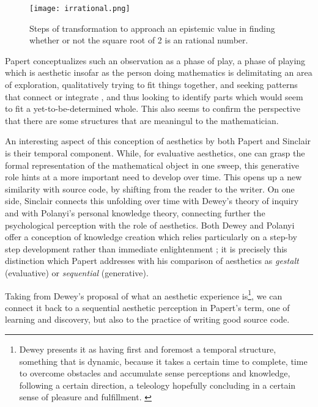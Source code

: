 \begin{figure}
    \texttt{[image: irrational.png]}
    \caption{Steps of transformation to approach an epistemic value in finding whether or not the square root of 2 is an rational number.}
    \label{graphic:irrational-proof}
\end{figure}

Papert conceptualizes such an observation as a phase of play, a phase of playing which is aesthetic insofar as the person doing mathematics is delimitating an area of exploration, qualitatively trying to fit things together, and seeking patterns that connect or integrate \citep{papert_mathematical_1978}, and thus looking to identify parts which would seem to fit a yet-to-be-determined whole. This also seems to confirm the perspective that there are some structures that are meaningul to the mathematician.

An interesting aspect of this conception of aesthetics by both Papert and Sinclair is their temporal component. While, for evaluative aesthetics, one can grasp the formal representation of the mathematical object in one sweep, this generative role hints at a more important need to develop over time. This opens up a new similarity with source code, by shifting from the reader to the writer. On one side, Sinclair connects this unfolding over time with Dewey's theory of inquiry and with Polanyi's personal knowledge theory, connecting further the psychological perception with the role of aesthetics. Both Dewey and Polanyi offer a conception of knowledge creation which relies particularly on a step-by step development rather than immediate enlightenment \citep{polanyi_knowing_1969,sinclair_roles_2004}; it is precisely this distinction which Papert addresses with his comparison of aesthetics as \emph{gestalt} (evaluative) or \emph{sequential} (generative).

Taking from Dewey's proposal of what an aesthetic experience is\footnote{Dewey presents it as having first and foremost a temporal structure, something that is dynamic, because it takes a certain time to complete, time to overcome obstacles and accumulate sense perceptions and knowledge, following a certain direction, a teleology hopefully concluding in a certain sense of pleasure and fulfillment. \citep{leddy_dewey_2021}}, we can connect it back to a sequential aesthetic perception in Papert's term, one of learning and discovery, but also to the practice of writing good source code.

